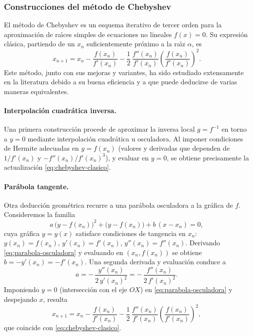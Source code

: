 \subsubsection{Construcciones del m\'etodo de Chebyshev}

El m\'etodo de Chebyshev es un esquema iterativo de tercer orden para la
aproximaci\'on de ra\'{\i}ces simples de ecuaciones no lineales $f(x)=0$.
Su expresi\'on cl\'asica, partiendo de un $x_n$ suficientemente pr\'oximo a la ra\'{\i}z
$\alpha$, es
\begin{equation}
\label{eq:chebyshev-clasico}
 x_{n+1} 
 	= x_n 
 	- \frac{f(x_n)}{f'(x_n)} 
 	- \frac{1}{2}\,\frac{f''(x_n)}{f'(x_n)}\left(\frac{f(x_n)}{f'(x_n)}\right)^{\!2}.
\end{equation}
Este m\'etodo, junto con sus mejoras y variantes, ha sido estudiado extensamente
en la literatura debido a su buena eficiencia y a que puede deducirse de varias
maneras equivalentes.

\paragraph{Interpolaci\'on cuadr\'atica inversa.}
Una primera construcci\'on procede de aproximar la inversa local $g=f^{-1}$
en torno a $y=0$ mediante interpolaci\'on cuadr\'atica u osculadora.
Al imponer condiciones de Hermite adecuadas en $y=f(x_n)$ (valores y derivadas
que dependen de $1/f'(x_n)$ y $-f''(x_n)/f'(x_n)^3$), y evaluar en $y=0$, se
obtiene precisamente la actualizaci\'on \eqref{eq:chebyshev-clasico}.

\paragraph{Par\'abola tangente.}
Otra deducci\'on geom\'etrica recurre a una par\'abola osculadora a la gr\'afica de $f$.
Consideremos la familia
\begin{equation}
\label{eq:parabola-osculadora}
 a\,\bigl(y-f(x_n)\bigr)^2 + \bigl(y-f(x_n)\bigr) + b\,(x-x_n) = 0,
\end{equation}
cuya gr\'afica $y=y(x)$ satisface condiciones de tangencia en $x_n$:
$y(x_n)=f(x_n)$, $y'(x_n)=f'(x_n)$, $y''(x_n)=f''(x_n)$. Derivando
\eqref{eq:parabola-osculadora} y evaluando en $(x_n,f(x_n))$ se obtiene
$b=-y'(x_n)=-f'(x_n)$. Una segunda derivada y evaluaci\'on conduce a
\[ a=-\,\frac{y''(x_n)}{2\,y'(x_n)^2}=-\,\frac{f''(x_n)}{2\,f'(x_n)^2}. \]
Imponiendo $y=0$ (intersecci\'on con el eje $OX$) en \eqref{eq:parabola-osculadora}
y despejando $x$, resulta
\[
 x_{n+1}=x_n-\frac{f(x_n)}{f'(x_n)}-\frac{1}{2}\,\frac{f''(x_n)}{f'(x_n)}\left(\frac{f(x_n)}{f'(x_n)}\right)^{\!2},
\]
que coincide con \eqref{eq:chebyshev-clasico}.

